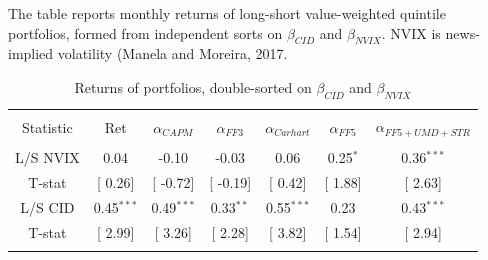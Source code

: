 \documentclass[12pt]{article}
\begin{document}
\begin{table}[!htbp] \centering 
  \caption{Returns of portfolios, double-sorted on $\beta_{CID}$ and $\beta_{NVIX}$} 
  \label{} 
    \begin{flushleft}
    {\medskip\small
 The table reports monthly returns of long-short value-weighted quintile portfolios, formed from independent sorts on $\beta_{CID}$ and $\beta_{NVIX}$. NVIX is news-implied volatility (Manela and Moreira, 2017.}
    \medskip
    \end{flushleft}
\begin{tabular}{@{\extracolsep{5pt}} ccccccc} 
\\[-1.8ex]\hline 
\hline \\[-1.8ex] 
Statistic & Ret & $\alpha_{CAPM}$ & $\alpha_{FF3}$ & $\alpha_{Carhart}$ & $\alpha_{FF5}$ & $\alpha_{FF5+UMD+STR}$ \\ 
\hline \\[-1.8ex] 
L/S NVIX & 0.04 & -0.10 & -0.03 & 0.06 & 0.25$^{*}$ & 0.36$^{***}$ \\ 
T-stat & [ 0.26] & [ -0.72] & [ -0.19] & [ 0.42] & [ 1.88] & [ 2.63] \\ 
L/S CID & 0.45$^{***}$ & 0.49$^{***}$ & 0.33$^{**}$ & 0.55$^{***}$ & 0.23 & 0.43$^{***}$ \\ 
T-stat & [ 2.99] & [ 3.26] & [ 2.28] & [ 3.82] & [ 1.54] & [ 2.94] \\ 
\hline \\[-1.8ex] 
\end{tabular} 
\end{table}

\newpage
\end{document}
